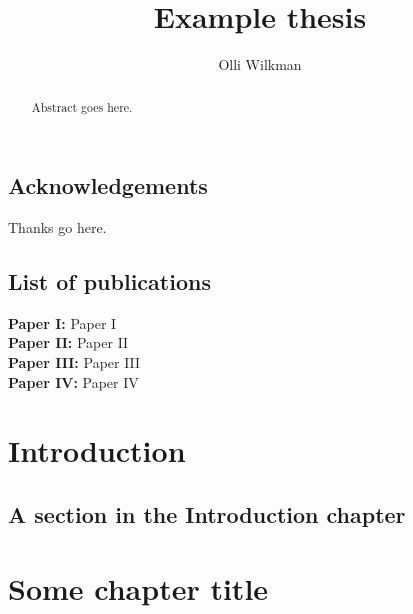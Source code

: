 \documentclass[11pt,english]{report}
\title{Example thesis}
\author{Olli Wilkman}
\begin{document}
\frontmatter

\maketitle

\begin{abstract}
	Abstract goes here.
\end{abstract}


\section{Acknowledgements}
	Thanks go here.


\section{List of publications}

\textbf{Paper I:} Paper I \\
\newline
\textbf{Paper II:} Paper II \\
\newline
\textbf{Paper III:} Paper III \\
\newline
\textbf{Paper IV:} Paper IV




\pagestyle{headings}
\tableofcontents


\mainmatter

\chapter{Introduction}

\section{A section in the Introduction chapter}

\chapter{Some chapter title}
\end{document}
